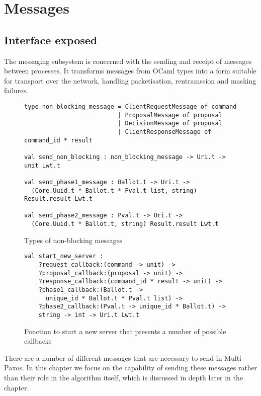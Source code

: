 \section{Messages}
\label{section:messages}
\subsection{Interface exposed}

The messaging subsystem is concerned with the sending and receipt of messages between processes. It transforms messages from OCaml types into a form suitable for transport over the network, handling packetisation, rentramssion and masking failures. \\

\begin{figure}[t]
  \begin{lstlisting}
type non_blocking_message = ClientRequestMessage of command
                          | ProposalMessage of proposal
                          | DecisionMessage of proposal
                          | ClientResponseMessage of command_id * result
                          
val send_non_blocking : non_blocking_message -> Uri.t -> unit Lwt.t

val send_phase1_message : Ballot.t -> Uri.t -> 
  (Core.Uuid.t * Ballot.t * Pval.t list, string) Result.result Lwt.t
    
val send_phase2_message : Pval.t -> Uri.t -> 
  (Core.Uuid.t * Ballot.t, string) Result.result Lwt.t
  \end{lstlisting}
  \centering
  \caption{Types of non-blocking messages}
  \label{message-types}
\end{figure}

\begin{figure}[t]
  \begin{lstlisting}
val start_new_server : 
    ?request_callback:(command -> unit) ->
    ?proposal_callback:(proposal -> unit) ->
    ?response_callback:(command_id * result -> unit) ->
    ?phase1_callback:(Ballot.t -> 
      unique_id * Ballot.t * Pval.t list) ->
    ?phase2_callback:(Pval.t -> unique_id * Ballot.t) ->
    string -> int -> Uri.t Lwt.t  
  \end{lstlisting}
  \centering
  \caption{Function to start a new server that presents a number of possible callbacks}
  \label{fig:message-server}
\end{figure}

There are a number of different messages that are necessary to send in Multi--Paxos. In this chapter we focus on the capability of sending these messages rather than their role in the algorithm itself, which is discussed in depth later in the chapter. \\

